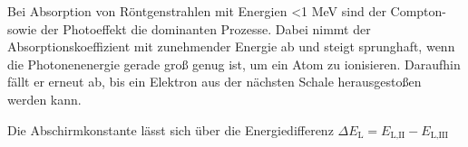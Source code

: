 Bei Absorption von Röntgenstrahlen mit Energien <1 MeV sind der Compton- sowie der Photoeffekt die dominanten Prozesse.
Dabei nimmt der Absorptionskoeffizient mit zunehmender Energie ab und steigt sprunghaft, wenn die Photonenenergie gerade groß genug ist, um ein Atom zu ionisieren.
Daraufhin fällt er erneut ab, bis ein Elektron aus der nächsten Schale herausgestoßen werden kann.

Die Abschirmkonstante lässt sich über die Energiedifferenz $\Delta E_\text{L} = E_\text{L,II} - E_\text{L,III}$